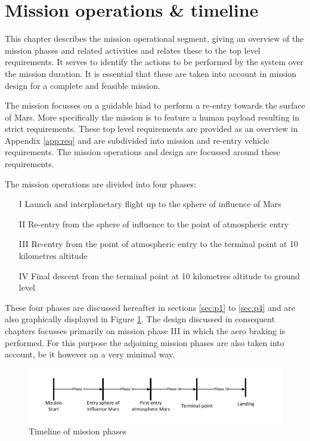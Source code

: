 \section{Mission operations \& timeline}\label{cha:opseg}
This chapter describes the mission operational segment, giving an overview of the mission phases and related activities and relates these to the top level requirements. It serves to identify the actions to be performed by the system over the mission duration. It is essential that these are taken into account in mission design for a complete and feasible mission. 

The mission focusses on a guidable \acrfull{hiad} to perform a re-entry towards the surface of Mars. More specifically the mission is to feature a human payload resulting in strict requirements. These top level requirements are provided as an overview in Appendix \ref{app:req} and are subdivided into mission and re-entry vehicle requirements. The mission operations and design are focussed around these requirements.

The mission operations are divided into four phases: 

\begin{itemize}
\item[I]{Launch and interplanetary flight up to the sphere of influence of Mars}
\item[II]{Re-entry from the sphere of influence to the point of atmospheric entry}
\item[III]{Re-entry from the point of atmospheric entry to the terminal point at 10 kilometres altitude}
\item[IV]{Final descent from the terminal point at 10 kilometres altitude to ground level}
\end{itemize}

These four phases are discussed hereafter in sections \ref{sec:p1} to \ref{sec:p4} and are also graphically displayed in Figure  \ref{fig:time}. The design discussed in consequent chapters focusses primarily on mission phase III in which the aero braking is performed. For this purpose the adjoining mission phases are also taken into account, be it however an a very minimal way. 

\begin{figure}[H]
\centering
\includegraphics[width = 1.0\textwidth]{Figure/OPS.pdf}
\caption{Timeline of mission phases}
\label{fig:time}
\end{figure}


